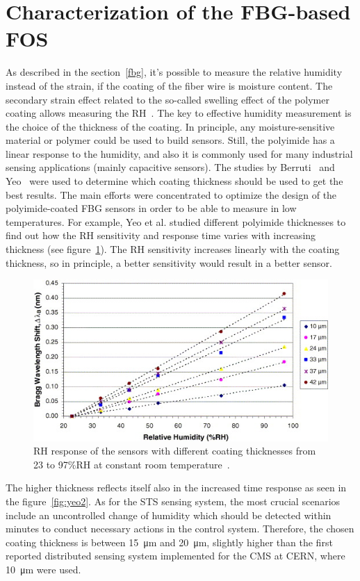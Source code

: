 \section{Characterization of the FBG-based FOS}
As described in the section~\ref{fbg}, it's possible to measure the relative humidity instead of the strain, if the coating of the fiber wire is moisture content. The secondary strain effect related to the so-called swelling effect of the polymer coating allows measuring the \gls{RH}~\cite{YEO_PI}. The key to effective humidity measurement is the choice of the thickness of the coating. In principle, any moisture-sensitive material or polymer could be used to build sensors. Still, the polyimide has a linear response to the humidity, and also it is commonly used for many industrial sensing applications (mainly capacitive sensors). The studies by Berruti~\cite{Berruti} and Yeo~\cite{YEO_PI} were used to determine which coating thickness should be used to get the best results. The main efforts were concentrated to optimize the design of the polyimide-coated FBG sensors in order to be able to measure in low temperatures. For example, Yeo et al. \cite{YEO_PI} studied different polyimide thicknesses to find out how the \gls{RH} sensitivity and response time varies with increasing thickness (see figure~\ref{fig:yeo}). The \gls{RH} sensitivity increases linearly with the coating thickness, so in principle, a better sensitivity would result in a better sensor.
\begin{figure}[!h]
\centering
\includegraphics[width=0.75\columnwidth]{Chapter5/images/yeo_coating.jpg}
\caption{RH response of the sensors with different coating thicknesses from 23 to 97\%RH at constant room temperature~\cite{YEO_PI}.}
\label{fig:yeo}
\end{figure}
The higher thickness reflects itself also in the increased time response as seen in the figure~\ref{fig:yeo2}. As for the \gls{STS} sensing system, the most crucial scenarios include an uncontrolled change of humidity which should be detected within minutes to conduct necessary actions in the control system. Therefore, the chosen coating thickness is between \SI{15}{\micro\metre} and \SI{20}{\micro\metre}, slightly higher than the first reported distributed sensing system implemented for the \gls{CMS} at \gls{CERN}, where \SI{10}{\micro\metre} were used. 
